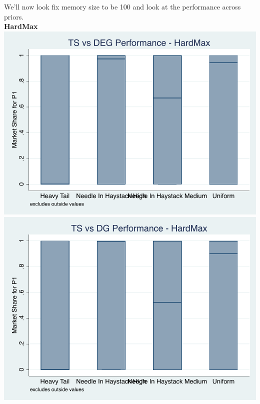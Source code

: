 \documentclass[11pt,letterpaper]{article}
\begin{document}
\pagebreak
We'll now look fix memory size to be 100 and look at the performance across priors.\\
\textbf{HardMax} \\
\includegraphics[scale=1]{hm_ts_deg_prior} \\
\includegraphics[scale=1]{hm_ts_dg_prior}
\end{document}
